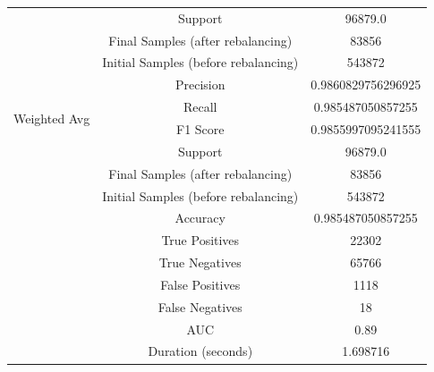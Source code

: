 \begin{longtable}{|c|c|c|}
 & Support & 96879.0 \\
 & Final Samples (after rebalancing) & 83856 \\
 & Initial Samples (before rebalancing) & 543872 \\
\hline
\multirow{4}{*}{Weighted Avg} & Precision & 0.9860829756296925 \\
 & Recall & 0.985487050857255 \\
 & F1 Score & 0.9855997095241555 \\
 & Support & 96879.0 \\
 & Final Samples (after rebalancing) & 83856 \\
 & Initial Samples (before rebalancing) & 543872 \\
\hline
& Accuracy & 0.985487050857255 \\ \hline
& True Positives & 22302 \\ \hline
& True Negatives & 65766 \\ \hline
& False Positives & 1118 \\ \hline
& False Negatives & 18 \\ \hline
& AUC & 0.89 \\ \hline
& Duration (seconds) & 1.698716 \\ \hline
\end{longtable}


